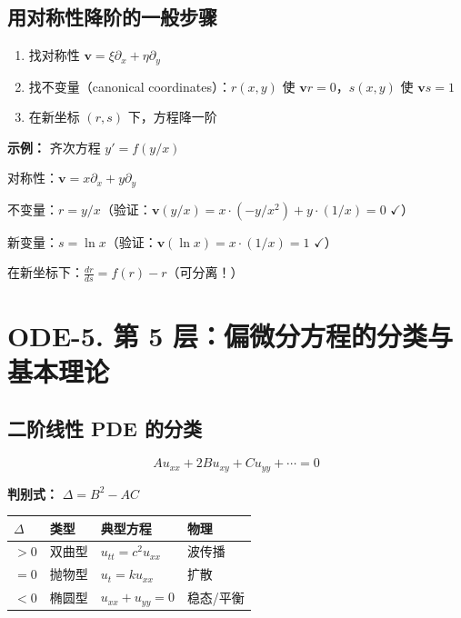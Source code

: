 \subsection{用对称性降阶的一般步骤}

\begin{enumerate}
  \item 找对称性 $\mathbf{v} = \xi\partial_x + \eta\partial_y$
  \item 找不变量（canonical coordinates）：$r(x,y)$ 使 $\mathbf{v}r = 0$，$s(x,y)$ 使 $\mathbf{v}s = 1$
  \item 在新坐标 $(r, s)$ 下，方程降一阶
\end{enumerate}

\textbf{示例：} 齐次方程 $y' = f(y/x)$

对称性：$\mathbf{v} = x\partial_x + y\partial_y$

不变量：$r = y/x$（验证：$\mathbf{v}(y/x) = x \cdot (-y/x^2) + y \cdot (1/x) = 0$ $\checkmark$）

新变量：$s = \ln x$（验证：$\mathbf{v}(\ln x) = x \cdot (1/x) = 1$ $\checkmark$）

在新坐标下：$\frac{dr}{ds} = f(r) - r$（可分离！）

\section{ODE-5. 第 5 层：偏微分方程的分类与基本理论}

\subsection{二阶线性 PDE 的分类}

\[
Au_{xx} + 2Bu_{xy} + Cu_{yy} + \cdots = 0
\]

\textbf{判别式：} $\Delta = B^2 - AC$

\begin{center}
\begin{tabular}{L{2cm}L{2.5cm}L{4cm}L{3cm}}
\toprule
\textbf{$\Delta$} & \textbf{类型} & \textbf{典型方程} & \textbf{物理} \\
\midrule
$> 0$ & 双曲型 & $u_{tt} = c^2 u_{xx}$ & 波传播 \\
$= 0$ & 抛物型 & $u_t = ku_{xx}$ & 扩散 \\
$< 0$ & 椭圆型 & $u_{xx} + u_{yy} = 0$ & 稳态/平衡 \\
\bottomrule
\end{tabular}
\end{center}


